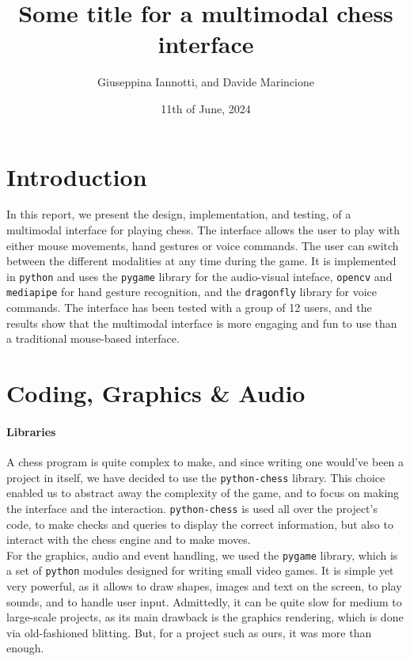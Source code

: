 \documentclass[a4paper, 11pt, twocolumn]{IEEEtran}
\title{Some title for a multimodal chess interface}
\author{Giuseppina Iannotti, and Davide Marincione}
\date{11th of June, 2024}
\begin{document}
    \maketitle

    \section{Introduction}
    In this report, we present the design, implementation, and testing, of a multimodal interface for playing chess. The interface allows the user to play with either mouse movements, hand gestures or voice commands. The user can switch between the different modalities at any time during the game. It is implemented in \texttt{python} and uses the \texttt{pygame} library for the audio-visual inteface, \texttt{opencv} and \texttt{mediapipe} for hand gesture recognition, and the \texttt{dragonfly} library for voice commands. The interface has been tested with a group of 12 users, and the results show that the multimodal interface is more engaging and fun to use than a traditional mouse-based interface.

    \section{Coding, Graphics \& Audio}
    \paragraph*{Libraries} A chess program is quite complex to make, and since writing one would've been a project in itself, we have decided to use the \texttt{python-chess} library. This choice enabled us to abstract away the complexity of the game, and to focus on making the interface and the interaction. \texttt{python-chess} is used all over the project's code, to make checks and queries to display the correct information, but also to interact with the chess engine and to make moves.\\For the graphics, audio and event handling, we used the \texttt{pygame} library, which is a set of \texttt{python} modules designed for writing small video games. It is simple yet very powerful, as it allows to draw shapes, images and text on the screen, to play sounds, and to handle user input. Admittedly, it can be quite slow for medium to large-scale projects, as its main drawback is the graphics rendering, which is done via old-fashioned blitting. But, for a project such as ours, it was more than enough.
\end{document}
